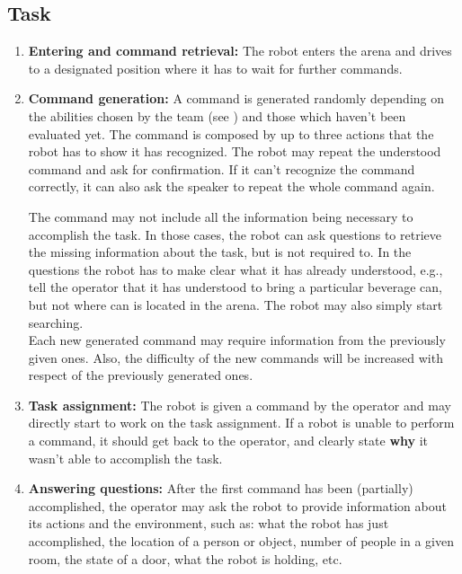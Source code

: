 \subsection{Task}

\begin{enumerate}
	\item \textbf{Entering and command retrieval:} The robot enters the arena and drives to a designated position where it has to wait for further commands. \\

	\item \textbf{Command generation:} A command is generated randomly depending on the abilities chosen by the team (see ) and those which haven't been evaluated yet. The command is composed by up to three actions that the robot has to show it has recognized. The robot may repeat the understood command and ask for confirmation. If it can't recognize the command correctly, it can also ask the speaker to repeat the whole command again.

	The command may not include all the information being necessary to accomplish the task. In those cases, the robot can ask questions to retrieve the missing information about the task, but is not required to. In the questions the robot has to make clear what it has already understood, e.g., tell the operator that it has understood to bring a particular beverage can, but not where can is located in the arena. The robot may also simply start searching. \\

	Each new generated command may require information from the previously given ones. Also, the difficulty of the new commands will be increased with respect of the previously generated ones. \\

	\item \textbf{Task assignment:} The robot is given a command by the operator and may directly start to work on the task assignment. If a robot is unable to perform a command, it should get back to the operator, and clearly state \textbf{why} it wasn't able to accomplish the task. \\

	\item \textbf{Answering questions:} After the first command has been (partially) accomplished, the operator may ask the robot to provide information about its actions and the environment, such as: what the robot has just accomplished, the location of a person or object, number of people in a given room, the state of a door, what the robot is holding, etc. \\


\end{enumerate}
